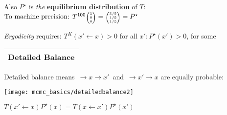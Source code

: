 \documentclass[25pt,landscape]{foils}
\newcommand{\Gray}{\textcolor{mygray}}
\newcommand{\LightGray}{\textcolor{mylightgray}}
\newcommand{\Green}{\textcolor{mypine}}
\newcommand{\myfoilhead}[1]{
\newpage
\vspace*{-1cm}
\Gray{
\begin{tabular*}{\textwidth}{l}
{\bf \Huge #1} \\
\bottomrule
\end{tabular*}}}
\newcommand{\la}{\!\leftarrow\!}
\newcommand{\ra}{\!\rightarrow\!}
\begin{document}
Also $P^\star$ is \emph{the} \Green{\bf equilibrium distribution} of $T$:\\[0.3cm]
\hspace*{4cm}$ \mbox{To machine precision: } T^{100} \mbox{\tiny $\left(\begin{matrix}1\\0\\0\end{matrix}\right)$}=
\mbox{\tiny $\left(\begin{matrix}3/5\\1/5\\1/5\end{matrix}\right)$} = P^\star$\\[0.3cm]

\vfill

\emph{Ergodicity} requires: $T^K(x'\la x)\!>\!0$ for all $x':P^\star(x')>0$, for some 

%
%
%
%

\myfoilhead{Detailed Balance}

\vspace*{1cm}

Detailed balance means $\,\ra x\ra x'\,$ and $\,\ra x'\ra x$ are equally probable:
\begin{center}
\texttt{[image: mcmc\_basics/detailedbalance2]}

$T(x'\leftarrow x)P^\star(x) = T(x\leftarrow x')P^\star(x')$

%
\end{center}
\end{document}

